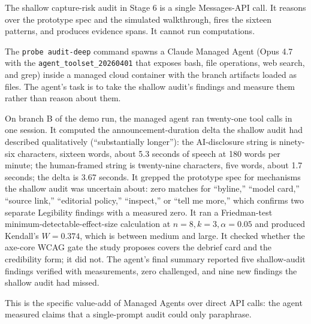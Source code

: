 The shallow capture-risk audit in Stage 6 is a single Messages-API call. It reasons over the prototype spec and the simulated walkthrough, fires the sixteen patterns, and produces evidence spans. It cannot run computations.

The \texttt{probe audit-deep} command spawns a Claude Managed Agent (Opus 4.7 with the \texttt{agent\_toolset\_20260401} that exposes bash, file operations, web search, and grep) inside a managed cloud container with the branch artifacts loaded as files. The agent's task is to take the shallow audit's findings and measure them rather than reason about them.

On branch B of the demo run, the managed agent ran twenty-one tool calls in one session. It computed the announcement-duration delta the shallow audit had described qualitatively (``substantially longer''): the AI-disclosure string is ninety-six characters, sixteen words, about 5.3 seconds of speech at 180 words per minute; the human-framed string is twenty-nine characters, five words, about 1.7 seconds; the delta is 3.67 seconds. It grepped the prototype spec for mechanisms the shallow audit was uncertain about: zero matches for ``byline,'' ``model card,'' ``source link,'' ``editorial policy,'' ``inspect,'' or ``tell me more,'' which confirms two separate Legibility findings with a measured zero. It ran a Friedman-test minimum-detectable-effect-size calculation at $n=8, k=3, \alpha=0.05$ and produced Kendall's $W = 0.374$, which is between medium and large. It checked whether the axe-core WCAG gate the study proposes covers the debrief card and the credibility form; it did not. The agent's final summary reported five shallow-audit findings verified with measurements, zero challenged, and nine new findings the shallow audit had missed.

This is the specific value-add of Managed Agents over direct API calls: the agent measured claims that a single-prompt audit could only paraphrase.
